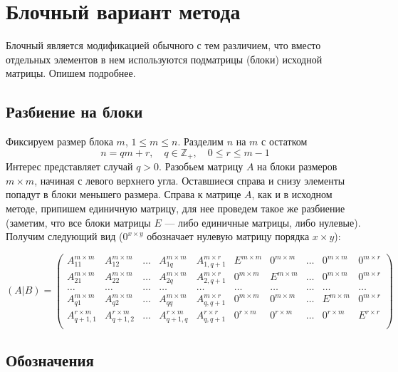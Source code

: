 \documentclass[12pt, russian]{article}
\begin{document}
\section{Блочный вариант метода}

Блочный является модификацией обычного с тем различием, что вместо отдельных элементов в нем используются подматрицы (блоки) исходной матрицы. Опишем подробнее.

\subsection{Разбиение на блоки}

Фиксируем размер блока $m$, $1\leq m \leq n$. Разделим $n$ на $m$ с остатком
$$ n = qm + r,\quad q\in \mathbb{Z}_+,\quad 0\leq r\leq m-1 $$
Интерес представляет случай $q > 0$. Разобьем матрицу $A$ на блоки размеров $m\times m$, начиная с левого верхнего угла. Оставшиеся справа и снизу элементы попадут в блоки меньшего размера. Справа к матрице $A$, как и в исходном методе, припишем единичную матрицу, для нее проведем такое же разбиение (заметим, что все блоки матрицы $E$ --- либо единичные матрицы, либо нулевые). Получим следующий вид ($0^{x\times y}$ обозначает нулевую матрицу порядка $x \times y$):

\[
(A|B) = \left(
\begin{array} {rrrrr|rrrrr}
A_{11}^{m\times m} & A_{12}^{m\times m} & \ldots & A_{1q}^{m\times m} & A_{1,q+1}^{m\times r}
& E^{m\times m} & 0^{m\times m} & \ldots & 0^{m\times m} & 0^{m\times r} \\
A_{21}^{m\times m} & A_{22}^{m\times m} & \ldots & A_{2q}^{m\times m} & A_{2,q+1}^{m\times r}
& 0^{m\times m} & E^{m\times m} & \ldots & 0^{m\times m} & 0^{m\times r} \\
\ldots & \ldots & \ldots & \ldots & \ldots & \ldots & \ldots & \ldots & \ldots & \ldots \\
A_{q1}^{m\times m} & A_{q2}^{m\times m} & \ldots & A_{qq}^{m\times m} & A_{q,q+1}^{m\times r}
& 0^{m\times m} & 0^{m\times m} & \ldots & E^{m\times m} & 0^{m\times r} \\
A_{q+1,1}^{r\times m} & A_{q+1,2}^{r\times m} & \ldots & A_{q+1,q}^{r\times m} & A_{q,q+1}^{r\times r}
& 0^{r\times m} & 0^{r\times m} & \ldots & 0^{r\times m} & E^{r\times r} \\
\end{array}
\right)
\]

\subsection{Обозначения}
\end{document}
